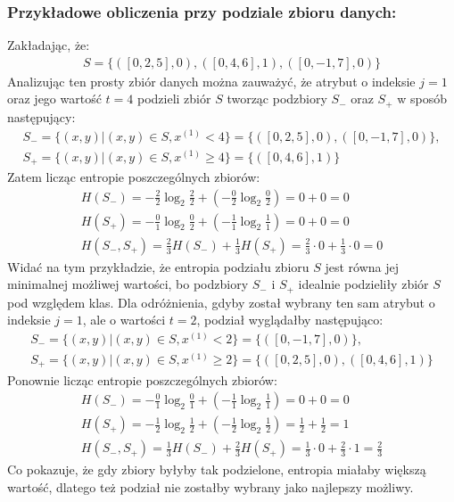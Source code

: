 \documentclass[
    left=2.5cm,         %
    right=2.5cm,        %
    top=2.5cm,          %
    bottom=3cm,         %
    bindingoffset=6mm,  %
    nohyphenation=false %
]{eiti/eiti-report}
\begin{document}
\subsubsection{Przykładowe obliczenia przy podziale zbioru danych:}
Zakładając, że: 
\begin{gather*}
    S = \{([0, 2, 5], 0), ([0, 4, 6], 1), ([0, -1, 7], 0)\}
\end{gather*}
Analizując ten prosty zbiór danych można zauważyć, że atrybut o indeksie $j = 1$ oraz jego wartość $t = 4$ podzieli zbiór $S$ tworząc podzbiory $S_{-}$ oraz $S_{+}$ w sposób następujący:
\begin{gather*}
    S_{-} = \{(x,y)|(x,y)\in{S}, x^{(1)}<4\} = \{([0, 2, 5], 0), ([0, -1, 7], 0)\},\\
    S_{+} = \{(x,y)|(x,y)\in{S}, x^{(1)}\ge{4}\} = \{([0, 4, 6], 1)\}
\end{gather*}
Zatem licząc entropie poszczególnych zbiorów:
\begin{gather*}
H(S_{-})=-\frac{2}{2}\log_2{\frac{2}{2}} + (-\frac{0}{2}\log_2{\frac{0}{2}}) = 0 + 0 = 0\\
H(S_{+})=-\frac{0}{1}\log_2{\frac{0}{2}} + (-\frac{1}{1}\log_2{\frac{1}{1}}) = 0 + 0 = 0\\
H(S_{-}, S_{+})=\frac{2}{3}H(S_{-})+\frac{1}{3}H(S_{+})  = \frac{2}{3}\cdot0+\frac{1}{3}\cdot0 = 0
\end{gather*}
Widać na tym przykładzie, że entropia podziału zbioru $S$ jest równa jej minimalnej możliwej wartości, bo podzbiory $S_{-}$ i $S_{+}$ idealnie podzieliły zbiór $S$ pod względem klas. Dla odróżnienia, gdyby został wybrany ten sam atrybut o indeksie $j = 1$, ale o wartości $t = 2$, podział wyglądałby następująco:
\begin{gather*}
    S_{-} = \{(x,y)|(x,y)\in{S}, x^{(1)}<2\} = \{([0, -1, 7], 0)\},\\
    S_{+} = \{(x,y)|(x,y)\in{S}, x^{(1)}\ge{2}\} = \{([0, 2, 5], 0), ([0, 4, 6], 1)\}
\end{gather*}
Ponownie licząc entropie poszczególnych zbiorów:
\begin{gather*}
H(S_{-})=-\frac{0}{1}\log_2{\frac{0}{1}} + (-\frac{1}{1}\log_2{\frac{1}{1}}) = 0 + 0 = 0\\
H(S_{+})=-\frac{1}{2}\log_2{\frac{1}{2}} + (-\frac{1}{2}\log_2{\frac{1}{2}}) = \frac{1}{2} + \frac{1}{2} = 1\\
H(S_{-}, S_{+})=\frac{1}{3}H(S_{-})+\frac{2}{3}H(S_{+})  = \frac{1}{3}\cdot0+\frac{2}{3}\cdot{1} = \frac{2}{3}
\end{gather*}
Co pokazuje, że gdy zbiory byłyby tak podzielone, entropia miałaby większą wartość, dlatego też podział nie zostałby wybrany jako najlepszy możliwy.
\end{document}

